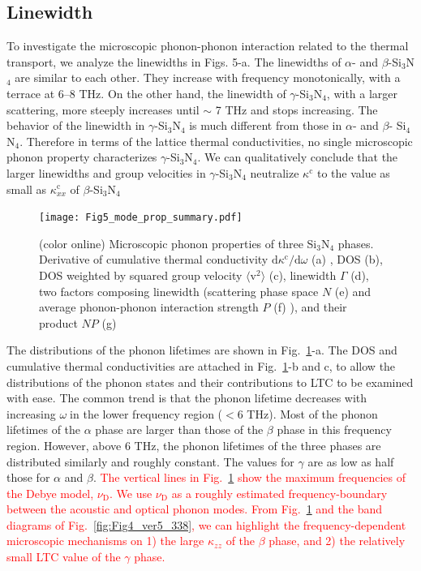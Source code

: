 \documentclass[twocolumn,amsmath,amssymb,a4paper,prb,superscriptaddress,floatfix]{revtex4-1}
\begin{document}
\subsection{Linewidth}
To investigate the microscopic phonon-phonon interaction related to the thermal transport, we analyze the linewidths in Figs. 5-a. The linewidths of $\alpha$- and $\beta$-Si$_3$N$_4$ are similar to each other. They increase with frequency monotonically, with a terrace at 6--8 THz.
On the other hand, the linewidth of $\gamma$-Si$_3$N$_4$, with a larger scattering, more steeply increases until $\sim$ 7 THz and stops increasing.
The behavior of the linewidth in $\gamma$-Si$_3$N$_4$ is much different from those in $\alpha$- and $\beta$- Si$_4$N$_4$. Therefore in terms of the lattice thermal conductivities, no single microscopic phonon property characterizes $\gamma$-Si$_3$N$_4$. We can qualitatively conclude that the larger linewidths and group velocities in $\gamma$-Si$_3$N$_4$ neutralize $\kappa^\text{c}$ to the value as small as $\kappa^\text{c}_{xx}$ of $\beta$-Si$_3$N$_4$      


\begin{figure}[ht]
 \begin{center}
  \texttt{[image: Fig5\_mode\_prop\_summary.pdf]} \caption{(color
	  online) Microscopic phonon properties of three Si$_3$N$_4$ phases. Derivative of cumulative thermal conductivity $\text{d}\kappa^\text{c}/\text{d}\omega$ (a)
	  , DOS (b), DOS weighted by squared group velocity $\langle\text{v}^2\rangle$ (c), linewidth $\Gamma$ (d), two factors composing linewidth (scattering phase space $N$ (e) and average phonon-phonon interaction strength $P$ (f) ), and their product $NP$ (g) 
  \label{fig:Fig5_338_rev} }
 \end{center}
\end{figure}

The distributions of the phonon lifetimes are shown in
Fig.~\ref{fig:Fig5_338_rev}-a. The DOS and cumulative thermal
conductivities are attached in Fig.~\ref{fig:Fig5_338_rev}-b and c, to
allow the distributions of the phonon states and their contributions to
LTC to be examined with ease. The common trend is that the phonon
lifetime decreases with increasing $\omega$in the lower frequency
region ($<6$ THz). Most of the phonon lifetimes of the $\alpha$ phase
are larger than those of the $\beta$ phase in this frequency
region. However, above 6 THz, the phonon lifetimes of the three phases
are distributed similarly and roughly constant. The values for $\gamma$
are as low as half those for $\alpha$ and $\beta$.
%
\textcolor{red}{The vertical lines in Fig.~\ref{fig:Fig5_338_rev} show
the maximum frequencies of the Debye model, $\nu_\text{D}$. We use
$\nu_\text{D}$ as a roughly estimated frequency-boundary between the
acoustic and optical phonon modes. From Fig.~\ref{fig:Fig5_338_rev} and
the band diagrams of Fig.~\ref{fig:Fig4_ver5_338}, we can highlight the
frequency-dependent microscopic mechanisms on 1) the large $\kappa_{zz}$
of the $\beta$ phase, and 2) the relatively small LTC value of the
$\gamma$ phase.}
\end{document}
